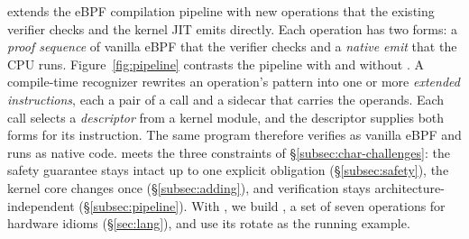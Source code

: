 \tool extends the eBPF compilation pipeline with new operations that the existing verifier checks and the kernel JIT emits directly.
Each operation has two forms: a \emph{proof sequence} of vanilla eBPF that the verifier checks and a \emph{native emit} that the CPU runs.
Figure~\ref{fig:pipeline} contrasts the pipeline with and without \tool.
A compile-time recognizer rewrites an operation's pattern into one or more \emph{extended instructions}, each a pair of a call and a sidecar that carries the operands.
Each call selects a \emph{descriptor} from a kernel module, and the descriptor supplies both forms for its instruction.
The same program therefore verifies as vanilla eBPF and runs as native code.
\tool meets the three constraints of \S\ref{subsec:char-challenges}: the safety guarantee stays intact up to one explicit obligation (\S\ref{subsec:safety}), the kernel core changes once (\S\ref{subsec:adding}), and verification stays architecture-independent (\S\ref{subsec:pipeline}).
With \tool, we build \lang, a set of seven operations for hardware idioms (\S\ref{sec:lang}), and use its rotate as the running example.

